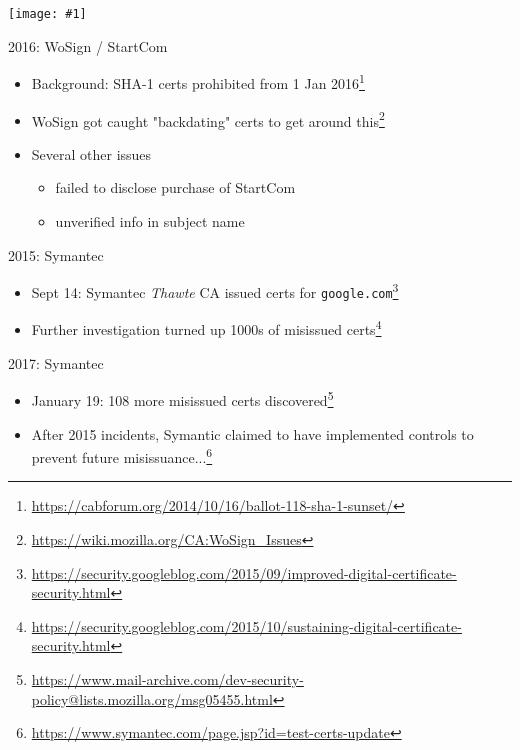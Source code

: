 \documentclass[ignorenonframetext,aspectratio=169]{beamer}
\makeatletter
\def\maxwidth{\ifdim\Gin@nat@width>\linewidth\linewidth\else\Gin@nat@width\fi}
\def\maxheight{\ifdim\Gin@nat@height>\textheight0.8\textheight\else\Gin@nat@height\fi}
\newcommand{\includegraphicsscaled}[1]{
    \texttt{[image: \#1]}
}
\makeatother
\begin{document}
\begin{frame}[plain]

\begin{center}
\includegraphicsscaled{Censign.jpg}
\end{center}

\end{frame}

\begin{frame}{2016: WoSign / StartCom}

\begin{itemize}
\item Background: SHA-1 certs prohibited from 1 Jan 2016\footnote[frame]{
  \url{https://cabforum.org/2014/10/16/ballot-118-sha-1-sunset/}}
\item WoSign got caught "backdating" certs to get around this\footnote[frame]{
  \url{https://wiki.mozilla.org/CA:WoSign_Issues}}
\item Several other issues
  \begin{itemize}
  \item failed to disclose purchase of StartCom
  \item unverified info in subject name
  \end{itemize}
\end{itemize}

\end{frame}

\begin{frame}{2015: Symantec}

\begin{itemize}

\item Sept 14: Symantec {\em Thawte} CA issued certs for
  {\tt google.com}\footnote{\url{https://security.googleblog.com/2015/09/improved-digital-certificate-security.html}}

\item Further investigation turned up 1000s of misissued
  certs\footnote{\url{https://security.googleblog.com/2015/10/sustaining-digital-certificate-security.html}}

\end{itemize}

\end{frame}

\begin{frame}{2017: Symantec}

\begin{itemize}

\item January 19: 108 more misissued certs
  discovered\footnote{\url{https://www.mail-archive.com/dev-security-policy@lists.mozilla.org/msg05455.html}}

\item After 2015 incidents, Symantic claimed to have implemented
  controls to prevent future
  misissuance...\footnote{\url{https://www.symantec.com/page.jsp?id=test-certs-update}}

\end{itemize}

\end{frame}
\end{document}
